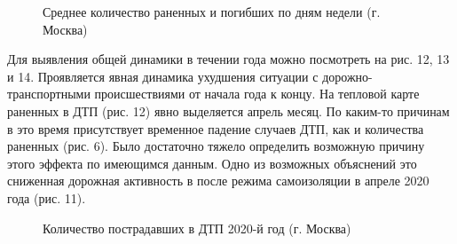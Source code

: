 \documentclass[a4paper, 14pt]{article}
\begin{document}
\begin{figure}[h]
	\caption{Среднее количество раненных и погибших по дням недели (г. Москва)}
\end{figure}

Для выявления общей динамики в течении года можно посмотреть на рис. 12, 13 и 14. Проявляется явная динамика ухудшения ситуации с дорожно-транспортными происшествиями от начала года к концу. На тепловой карте раненных в ДТП (рис. 12) явно выделяется апрель месяц. По каким-то причинам в это время присутствует временное падение случаев ДТП, как и количества раненных (рис. 6). Было достаточно тяжело определить возможную причину этого эффекта по имеющимся данным. Одно из возможных объяснений это сниженная дорожная активность в после режима самоизоляции в апреле 2020 года (рис. 11).

\begin{figure}[h]
	\caption{Количество пострадавших в ДТП 2020-й год (г. Москва)}
\end{figure}
\end{document}
